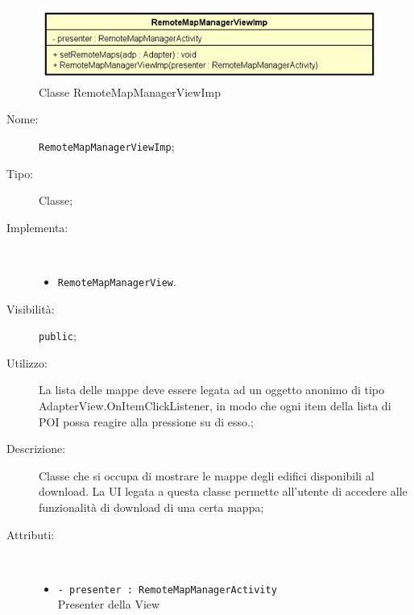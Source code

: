 \documentclass[../DefinizioneDiProdotto.tex]{subfiles}
\begin{document}
    \begin{figure}[H]
        \centering
        \includegraphics{img/RemoteMapManagerViewImp.png}
        \caption{Classe RemoteMapManagerViewImp}\label{fig:view::RemoteMapManagerViewImp} 
    \end{figure}
    \begin{description}
\item[Nome:] \texttt{RemoteMapManagerViewImp};
\item[Tipo:] Classe;
\item[Implementa:] \
\begin{itemize}
\item \texttt{RemoteMapManagerView}.

\end{itemize}
\item[Visibilità:] \texttt{public};
\item[Utilizzo:] La lista delle mappe deve essere legata ad un oggetto anonimo di tipo AdapterView.OnItemClickListener, in modo che ogni item della lista di POI possa reagire alla pressione su di esso.;
\item[Descrizione:] Classe che si occupa di mostrare le mappe degli edifici disponibili al download. La UI legata a questa classe permette all'utente di accedere alle funzionalità di download di una certa mappa;
\item[Attributi:] \
\begin{itemize}
\item \texttt{- presenter : RemoteMapManagerActivity}\\
Presenter della View


\end{itemize}
\end{description}
\end{document}
